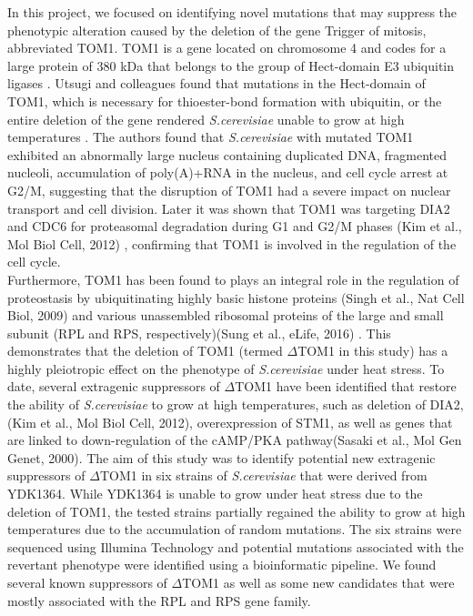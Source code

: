 \documentclass[10pt,a4paper]{article}
\begin{document}
\noindent In this project, we focused on identifying novel mutations that may suppress the phenotypic alteration caused by the deletion of the gene Trigger of mitosis, abbreviated TOM1. TOM1 is a gene located on chromosome 4 and codes for a large protein of 380 kDa that belongs to the group of Hect-domain E3 ubiquitin ligases \cite{utsugi_yeast_1999}. Utsugi and colleagues found that mutations in the Hect-domain of TOM1, which is necessary for thioester-bond formation with ubiquitin, or the entire deletion of the gene rendered \textit{S.cerevisiae} unable to grow at high temperatures \cite{utsugi_yeast_1999}. The authors found that \textit{S.cerevisiae} with mutated TOM1 exhibited an abnormally large nucleus containing duplicated DNA, fragmented nucleoli, accumulation of poly(A)+RNA in the nucleus, and cell cycle arrest at G2/M, suggesting that the disruption of TOM1 had a severe impact on nuclear transport and cell division. Later it was shown that TOM1 was targeting DIA2 and CDC6 for proteasomal degradation during G1 and G2/M phases (Kim et al., Mol Biol Cell, 2012)
, confirming that TOM1 is involved in the regulation of the cell cycle.\\

\noindent Furthermore, TOM1 has been found to plays an integral role in the regulation of proteostasis by ubiquitinating highly basic histone proteins (Singh et al., Nat Cell Biol, 2009)
 and various unassembled ribosomal proteins of the large and small subunit (RPL and RPS, respectively)(Sung et al., eLife, 2016)
. This demonstrates that the deletion of TOM1 (termed $\Delta$TOM1 in this study) has a highly pleiotropic effect on the phenotype of \textit{S.cerevisiae} under heat stress. To date, several extragenic suppressors of $\Delta$TOM1 have been identified that restore the ability of  \textit{S.cerevisiae} to grow at high temperatures, such as deletion of DIA2, (Kim et al., Mol Biol Cell, 2012), overexpression of STM1, \cite{utsugi_high_1995} as well as genes that are linked to down-regulation of the cAMP/PKA pathway(Sasaki et al., Mol Gen Genet, 2000). 
The aim of this study was to identify potential new extragenic suppressors of $\Delta$TOM1 in six strains of  \textit{S.cerevisiae} that were derived from YDK1364. While YDK1364 is unable to grow under heat stress due to the deletion of TOM1, the tested strains partially regained the ability to grow at high temperatures due to the accumulation of random mutations. The six strains were sequenced using Illumina Technology and potential mutations associated with the revertant phenotype were identified using a bioinformatic pipeline. We found several known suppressors of $\Delta$TOM1 as well as some new candidates that were mostly associated with the RPL and RPS gene family. \\
\end{document}
